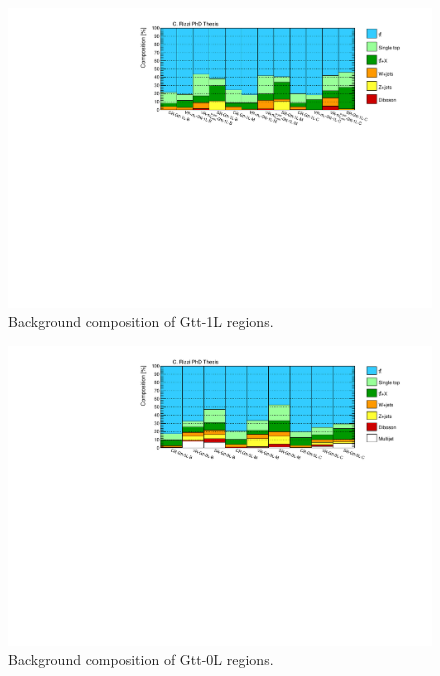\begin{figure}[h]
\includegraphics[width=\textwidth]{figures/strong_prod/comp_plots/Gtt_1L_bkg.pdf}
\caption{Background composition of Gtt-1L regions.}
	\label{fig:bkgcomp_Gtt1L}
\end{figure}

\begin{figure}[h]
\includegraphics[width=\textwidth]{figures/strong_prod/comp_plots/Gtt_0L_bkg.pdf}
\caption{Background composition of Gtt-0L regions.}
	\label{fig:bkgcomp_Gtt0L}
\end{figure}

